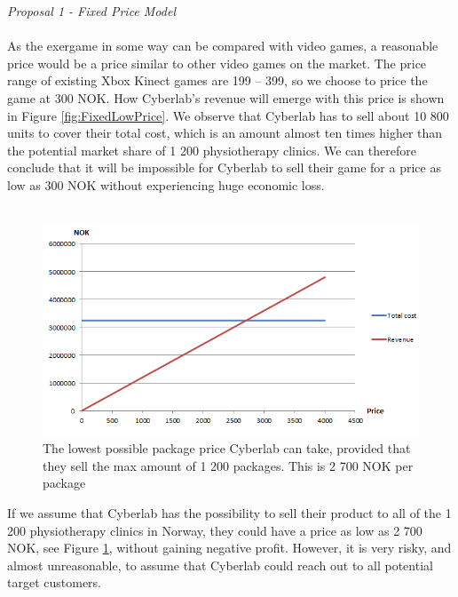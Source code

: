 \emph{Proposal 1 - Fixed Price Model}\\ \\
As the exergame in some way can be compared with video games, a reasonable price would be a price similar to other video games on the market. The price range of existing Xbox Kinect games are 199 – 399, so we choose to price the game at 300 NOK. How Cyberlab’s revenue will emerge with this price is shown in Figure \ref{fig:FixedLowPrice}. We observe that Cyberlab has to sell about 10 800 units to cover their total cost, which is an amount almost ten times higher than the potential market share of 1 200 physiotherapy clinics. We can therefore conclude that it will be impossible for Cyberlab to sell their game for a price as low as 300 NOK without experiencing huge economic loss.\\ \\
\begin{figure}
\begin{center}
\includegraphics[scale=0.8]{revenuestreamprice}
\caption[Price example]{The lowest possible package price Cyberlab can take, provided that they sell the max amount of 1 200 packages. This is 2 700 NOK per package}
\label{fig:RevenueStreamPrice}
\end{center}
\end{figure}
If we assume that Cyberlab has the possibility to sell their product to all of the 1 200 physiotherapy clinics in Norway, they could have a price as low as 2 700 NOK, see Figure \ref{fig:RevenueStreamPrice}, without gaining negative profit. However, it is very risky, and almost unreasonable, to assume that Cyberlab could reach out to all potential target customers. \\ \\
